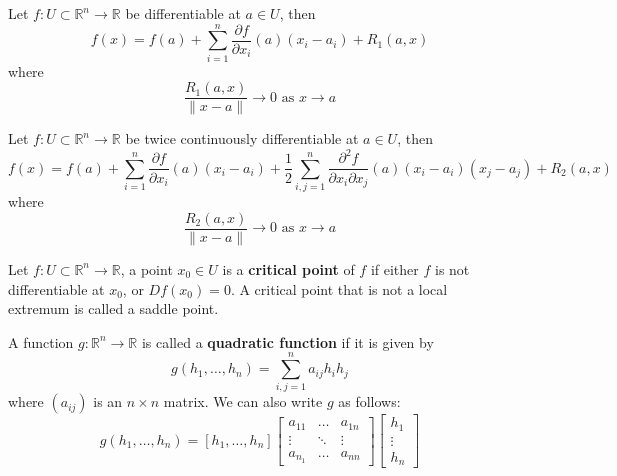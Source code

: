 \documentclass[openany]{book}
\newcommand{\R}{\mathbb{R}}
\begin{document}
\begin{defn}
    Let $f:U\subset\R^n\to\R$ be differentiable at $a\in U$, then 
    \begin{equation*}
        f(x)=f(a)+\sum_{i=1}^n\frac{\partial f}{\partial x_i}(a)(x_i-a_i)+R_1(a,x)
    \end{equation*}
    where 
    \begin{equation*}
        \frac{R_1(a,x)}{\|x-a\|}\to 0 \text{ as } x\to a
    \end{equation*}
\end{defn}

\begin{defn}\label{taylor}
    Let $f:U\subset\R^n\to\R$ be twice continuously differentiable at $a\in U$, then 
    \begin{equation*}
        f(x)=f(a)+\sum_{i=1}^n\frac{\partial f}{\partial x_i}(a)(x_i-a_i)+\frac{1}{2}\sum_{i,j=1}^n\frac{\partial^2 f}{\partial x_i\partial x_j}(a)(x_i-a_i)(x_j-a_j)+R_2(a,x)
    \end{equation*}
    where 
    \begin{equation*}
        \frac{R_2(a,x)}{\|x-a\|}\to 0 \text{ as } x\to a
    \end{equation*}
\end{defn}



\begin{defn}
    Let $f:U\subset\R^n\to\R$, a point $x_0\in U$ is a \textbf{critical point} of $f$ if either $f$ is not differentiable at $x_0$, or $Df(x_0)=0$. A critical point that is not a local extremum is called a saddle point.
\end{defn}

\begin{defn}
    A function $g:\R^n\to\R$ is called a \textbf{quadratic function} if it is given by 
    \begin{equation*}
        g(h_1,\dots, h_n)=\sum_{i,j=1}^na_{ij}h_ih_j
    \end{equation*}
    where $(a_{ij})$ is an $n\times n$ matrix. We can also write $g$ as follows:
    \begin{equation*}
        g(h_1,\dots,h_n)=[h_1,\dots,h_n]\begin{bmatrix}
            a_{11}&\dots &a_{1n}\\
            \vdots&\ddots &\vdots\\
            a_{n_1}&\dots&a_{nn}
        \end{bmatrix}\begin{bmatrix}
            h_1\\
            \vdots\\
            h_n
        \end{bmatrix}
    \end{equation*}

\end{defn}
\end{document}
